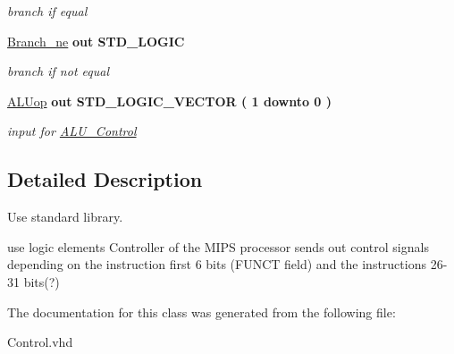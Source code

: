 \begin{DoxyCompactItemize}
\begin{DoxyCompactList}\small\item\em branch if equal \end{DoxyCompactList}\item 
\hypertarget{class_control_a24dd763afcb5d8a8d91e3c3f5a415704}{\hyperlink{class_control_a24dd763afcb5d8a8d91e3c3f5a415704}{\-Branch\-\_\-ne}  {\bfseries {\bfseries out }} {\bfseries \-S\-T\-D\-\_\-\-L\-O\-G\-I\-C } }\label{class_control_a24dd763afcb5d8a8d91e3c3f5a415704}

\begin{DoxyCompactList}\small\item\em branch if not equal \end{DoxyCompactList}\item 
\hypertarget{class_control_accc0d3f810d226b65ebd44774daada7e}{\hyperlink{class_control_accc0d3f810d226b65ebd44774daada7e}{\-A\-L\-Uop}  {\bfseries {\bfseries out }} {\bfseries \-S\-T\-D\-\_\-\-L\-O\-G\-I\-C\-\_\-\-V\-E\-C\-T\-O\-R (   1    downto    0  ) } }\label{class_control_accc0d3f810d226b65ebd44774daada7e}

\begin{DoxyCompactList}\small\item\em input for \hyperlink{class_a_l_u___control}{\-A\-L\-U\-\_\-\-Control} \end{DoxyCompactList}\end{DoxyCompactItemize}


\subsection{\-Detailed \-Description}
\-Use standard library. 

use logic elements \-Controller of the \-M\-I\-P\-S processor sends out control signals depending on the instruction first 6 bits (\-F\-U\-N\-C\-T field) and the instructions 26-\/31 bits(?) 

\-The documentation for this class was generated from the following file\-:\begin{DoxyCompactItemize}
\item 
\-Control.\-vhd\end{DoxyCompactItemize}
